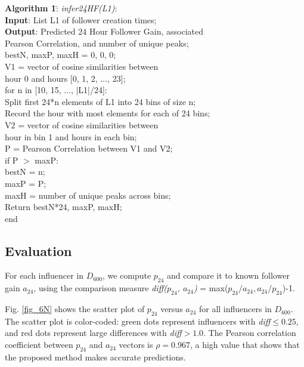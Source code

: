 {\selectfont
\begin{tabbing}
\textbf{Al}\=\textbf{go}\=\textbf{ri}\=\textbf{th}\=\textbf{m 1}\=: \textit{infer24HF(L1)}:\\
\> \textbf{Input}: List L1 of follower creation times; \\
\> \textbf{Output}: Predicted 24 Hour Follower Gain, associated\\
\> Pearson Correlation, and number of unique peaks;\\
\> bestN, maxP, maxH = 0, 0, 0;\\
\> V1 = vector of cosine similarities between\\
\> \> \> hour 0 and hours [0, 1, 2, ..., 23];\\
\> for n in [10, 15, ..., |L1|/24]:\\ 
\> \> Split first 24*n elements of L1 into 24 bins of size n;\\
\> \> Record the hour with most elements for each of 24 bins;\\ 
\> \> V2 = vector of cosine similarities between\\
\> \> \> \> hour in bin 1 and hours in each bin;\\
\> \> P = Pearson Correlation between V1 and V2;\\
\> \> if P $>$ maxP:\\
\> \> \> bestN = n;\\
\> \> \> maxP = P;\\
\> \> \> maxH = number of unique peaks across bins;\\
\> Return bestN*24, maxP, maxH; \\ 
end 
\end{tabbing}
}

\subsection{Evaluation}

For each influencer in $D_{600}$, we compute $p_{24}$ and compare it to known follower gain $a_{24}$, using the comparison measure \textit{diff($p_{24}$, $a_{24}$)} = max($p_{24}/a_{24}, a_{24}/p_{24}$)-1.

Fig. \ref{fig_6N} shows the scatter plot of $p_{24}$ versus $a_{24}$ for all influencers in $D_{600}$. The scatter plot is color-coded: green dots represent  influencers with \textit{diff}$\le 0.25$, and red dots represent large differences with \textit{diff}$>1.0$. The Pearson correlation coefficient between  $p_{24}$  and $a_{24}$ vectors is $\rho =0.967$, a high value that shows that the proposed  method makes  accurate predictions. %

